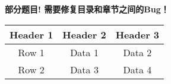 \begin{table}[!htbp]
            \vspace*{20pt}
            \begin{center}
                \color{red} \LARGE \bf 部分题目! 需要修复目录和章节之间的Bug！
            \end{center}

            
            \end{table}





\begin{table}[htb]
    \centering
        \begin{tabular}{ccc}
            \toprule
                 Header 1 & Header 2 & Header 3 \\
            \midrule
                Row 1    & Data 1   & Data 2   \\
                Row 2    & Data 3   & Data 4   \\
            \bottomrule
        \end{tabular}
\end{table}